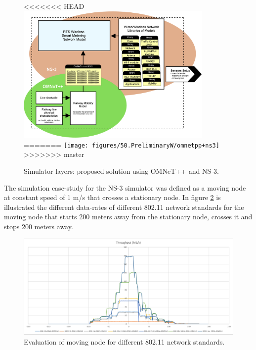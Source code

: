 \begin{figure}[h!]
	\centering
<<<<<<< HEAD
	\includegraphics[width=0.85\textwidth,keepaspectratio]{figures/50.PreliminaryW/omnetpp+ns32}
=======
	\texttt{[image: figures/50.PreliminaryW/omnetpp+ns3]}
>>>>>>> master
	\caption{Simulator layers: proposed solution using OMNeT++ and NS-3.}
	\label{fig:5.omnetpp+ns3}
\end{figure}

The simulation case-study for the NS-3 simulator was defined as a moving node at constant speed of 1 m/s that crosses a stationary node. In figure \ref{fig:5.distance-rate} is illustrated the different data-rates of different  802.11 network standards for the moving node that starts 200 meters away from the stationary node, crosses it and stops 200 meters away.

\begin{figure}[h!]
	\centering
	\includegraphics[width=\textwidth,keepaspectratio]{figures/50.PreliminaryW/distance-rate}
	\caption{Evaluation of moving node for different 802.11 network standards.}
	\label{fig:5.distance-rate}
\end{figure}


